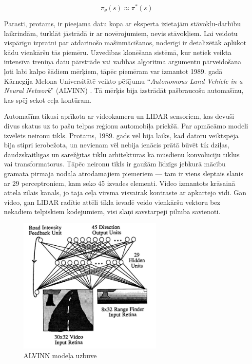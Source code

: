 \documentclass[12pt, a4paper]{article}
\numberwithin{equation}{section} %
\begin{document}
\begin{equation}
    \pi_{\theta}(s) \approx \pi^*(s)
\end{equation}

Parasti, protams, ir pieejama datu kopa ar eksperta izietajām stāvokļu-darbību laikrindām, turklāt jāstrādā ir ar novērojumiem, nevis stāvokļiem. Lai veidotu vispārīgu izpratni par atdarinošo mašīnmācīšanos, noderīgi ir detalizētāk aplūkot kādu vienkāršu tās piemēru. Uzvedības klonēšana sistēmā, kur netiek veikta intensīva treniņa datu pārstrāde vai vadības algoritma argumentu pārveidošana ļoti labi kalpo šādiem mērķiem, tāpēc piemēram var izmantot 1989. gadā Kārnegija-Melona Universitātē veikto pētījumu ``\textit{Autonomous Land Vehicle in a Neural Network}'' (ALVINN) \cite{pomerleau1989alvinn}. Tā mērķis bija izstrādāt pašbraucošu automašīnu, kas spēj sekot ceļa kontūram.

Automašīna tikusi aprīkota ar videokameru un LIDAR sensoriem, kas devuši divus skatus uz to pašu telpas reģionu automobiļa priekšā. Par apmācāmo modeli izvēlēts neironu tīkls. Protams, 1989. gads vēl bija laiks, kad datoru veiktspēja bija stipri ierobežota, un nevienam vēl nebija ienācis prātā būvēt tik dziļas, daudzskaitlīgas un sarežģītas tīklu arhitektūras kā mūsdienu konvolūciju tīklus vai transformatorus. Tāpēc neironu tīkls ir gaužām līdzīgs jebkurā mācību grāmatā pirmajā nodaļā atrodamajiem piemēriem --- tam ir viens slēptais slānis ar 29 perceptroniem, kam seko 45 izvades elementi. Video izmantots krāsainā attēla zilais kanāls, jo tajā ceļa virsma visvairāk kontrastē ar apkārtējo vidi. Gan video, gan LIDAR radītie attēli tīkla ievadē veido vienkāršu vektoru bez nekādiem telpiskiem kodējumiem, visi slāņi savstarpēji pilnībā savienoti.

\begin{figure}[t!]
    \centering
    \includegraphics[height=6.8cm,page=1]{../img/alvinn_architecture.png}
    \caption{ALVINN modeļa uzbūve \cite{pomerleau1989alvinn}}
\end{figure}
\end{document}

